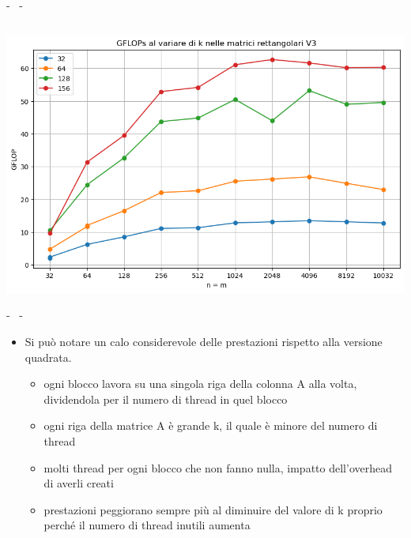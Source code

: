 \documentclass[compress]{beamer}
\begin{document}
\begin{frame}{\secname \text{ }- \subsecname\ \text{ }- \subsubsecname}
\begin{columns}
\begin{minipage}{0.8\textwidth}
\begin{adjustbox}{margin=1.5cm 0cm 0cm 0cm, center}
                \end{adjustbox}
            \end{minipage}
    \end{columns}
    \begin{minipage}{0.45\textwidth}
        \centering
        \begin{adjustbox}{margin=7cm 0cm 0cm 0.2cm, center} %
            \includegraphics[width=1.1\textwidth, frame]{resources/gpu_matrix_rect_perfv3.png}
        \end{adjustbox}
    \end{minipage}
\end{frame}

\begin{frame}{\secname \text{ }- \subsecname\ \text{ }- \subsubsecname}
    \begin{itemize}
    \item Si può notare un calo considerevole delle prestazioni rispetto alla versione quadrata.
        \begin{itemize}
            \item ogni blocco lavora su una singola riga della colonna A alla volta, dividendola per il numero di thread in quel blocco
            \item ogni riga della matrice A è grande k, il quale è minore del numero di thread
            \item molti thread per ogni blocco che non fanno nulla, impatto dell'overhead di averli creati
            \item prestazioni peggiorano sempre più al diminuire del valore di k proprio perché il numero di thread inutili aumenta
        \end{itemize}
    \end{itemize}
\end{frame}
\end{document}
